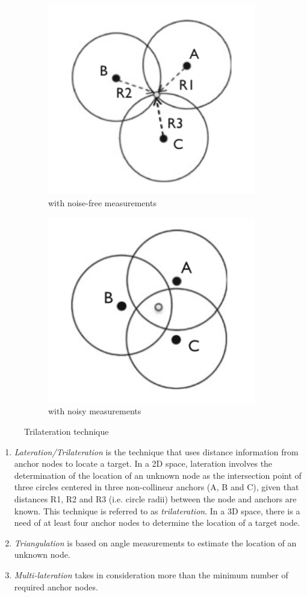 \documentclass[a4paper,12pt]{article}
\begin{document}
\begin{enumerate}
  \begin{figure}[t]
    \centering
    \begin{subfigure}{.5\textwidth}
      \centering
      \includegraphics[width=.4\linewidth]{img/noise-free-lateration}
      \caption{with noise-free measurements}
    \end{subfigure}%
    \begin{subfigure}{.5\textwidth}
      \centering
      \includegraphics[width=.4\linewidth]{img/lateration}
      \caption{with noisy measurements}
    \end{subfigure}
    \caption{Trilateration technique}
  \end{figure}

  \begin{enumerate}[label=(\roman*)]
    \item \textit{Lateration/Trilateration} is the technique that uses distance information from anchor nodes to locate a target. In a 2D space, lateration involves the determination of the location of an unknown node as the intersection point of three circles centered in three non-collinear anchors (A, B and C), given that distances R1, R2 and R3 (i.e. circle radii) between the node and anchors are known. This technique is referred to as \textit{trilateration}. In a 3D space, there is a need of at least four anchor nodes to determine the location of a target node.
    \item \textit{Triangulation} is based on angle measurements to estimate the location of an unknown node.
    \item \textit{Multi-lateration} takes in consideration more than the minimum number of required anchor nodes.
  \end{enumerate}
\end{enumerate}
\end{document}
